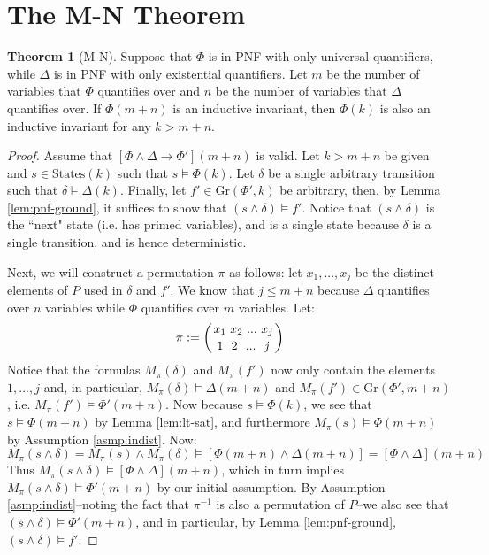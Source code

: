 \documentclass[12pt]{article}
\theoremstyle{definition}
\newtheorem{theorem}{Theorem}
\theoremstyle{remark}
\newcommand{\msp}{\text{ }}
\newcommand{\states}{\text{States}}
\newcommand{\gr}{\text{Gr}}
\newcommand{\perm}{\genfrac{}{}{0pt}{}}
\begin{document}
\section{The M-N Theorem}
\begin{theorem}[M-N]
  Suppose that $\Phi$ is in PNF with only universal quantifiers, while $\Delta$ is in PNF with only existential quantifiers.  Let $m$ be the number of variables that $\Phi$ quantifies over and $n$ be the number of variables that $\Delta$ quantifies over.  If $\Phi(m+n)$ is an inductive invariant, then $\Phi(k)$ is also an inductive invariant for any $k>m+n$.
\end{theorem}
\begin{proof}
  Assume that $[\Phi\land\Delta \rightarrow \Phi'](m+n)$ is valid.  Let $k>m+n$ be given and $s \in \states(k)$ such that $s \models \Phi(k)$.  Let $\delta$ be a single arbitrary transition such that $\delta \models \Delta(k)$.  Finally, let $f' \in \gr(\Phi',k)$ be arbitrary, then, by Lemma \ref{lem:pnf-ground}, it suffices to show that $(s \land \delta) \models f'$.  Notice that $(s \land \delta)$ is the ``next" state (i.e. has primed variables), and is a single state because $\delta$ is a single transition, and is hence deterministic.

  Next, we will construct a permutation $\pi$ as follows: let $x_1,...,x_j$ be the distinct elements of $P$ used in $\delta$ and $f'$.  We know that $j \leq m+n$ because $\Delta$ quantifies over $n$ variables while $\Phi$ quantifies over $m$ variables.  Let:
  $$\pi := \left( \perm{x_1 \msp x_2 \msp ... \msp x_j}{1 \msp\msp 2 \msp\msp ... \msp\msp j} \right)$$
  Notice that the formulas $M_\pi(\delta)$ and $M_\pi(f')$ now only contain the elements $1,...,j$ and, in particular, $M_\pi(\delta) \models \Delta(m+n)$ and $M_\pi(f') \in \gr(\Phi',m+n)$, i.e. $M_\pi(f') \models \Phi'(m+n)$.  Now because $s \models \Phi(k)$, we see that $s \models \Phi(m+n)$ by Lemma \ref{lem:lt-sat}, and furthermore $M_\pi(s) \models \Phi(m+n)$ by Assumption \ref{asmp:indist}.  Now:
  $$M_\pi(s \land \delta) = M_\pi(s) \land M_\pi(\delta) \models [\Phi(m+n) \land \Delta(m+n)] = [\Phi\land\Delta](m+n)$$
  Thus $M_\pi(s \land \delta) \models [\Phi\land\Delta](m+n)$, which in turn implies $M_\pi(s \land \delta) \models \Phi'(m+n)$ by our initial assumption.  By Assumption \ref{asmp:indist}--noting the fact that $\pi^{-1}$ is also a permutation of $P$--we also see that $(s \land \delta) \models \Phi'(m+n)$, and in particular, by Lemma \ref{lem:pnf-ground}, $(s \land \delta) \models f'$.
\end{proof}
\end{document}
